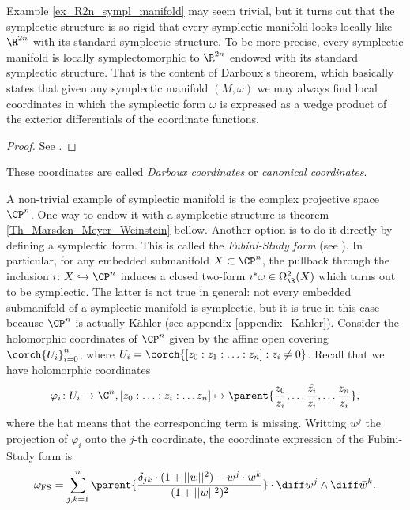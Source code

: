 Example \ref{ex_R2n_sympl_manifold} may seem trivial, but it turns out that the symplectic structure is so rigid that every symplectic manifold looks locally like \(\R^{2n}\) with its standard symplectic structure. To be more precise, every symplectic manifold is locally symplectomorphic to \(\R^{2n}\) endowed with its standard symplectic structure. That is the content of Darboux's theorem, which basically states that given any symplectic manifold \((M, \omega)\) we may always find local coordinates in which the symplectic form \(\omega\) is expressed as a wedge product of the exterior differentials of the coordinate functions.

\begin{proof}
    See \parencite[Prop. 22.13]{lee_introSM}.
\end{proof}
These coordinates are called \textit{Darboux coordinates} or \textit{canonical coordinates}. 

\begin{example} \label{ex_Fubini_Study}
    A non-trivial example of symplectic manifold is the complex projective space \(\CP^n\). One way to endow it with a symplectic structure is theorem \ref{Th_Marsden_Meyer_Weinstein} bellow. Another option is to do it directly by defining a symplectic form. This is called the \textit{Fubini-Study form} (see \parencite[Ex. 8.14]{lee_introCM}). In particular, for any embedded submanifold \(X \subset \CP^n\), the pullback through the inclusion \(\imath \colon X \hookrightarrow \CP^n\) induces a closed two-form \(\imath^*\omega\in \Omega_\R^2(X)\) which turns out to be symplectic. The latter is not true in general: not every embedded submanifold of a symplectic manifold is symplectic, but it is true in this case because \(\CP^n\) is actually Kähler (see appendix \ref{appendix_Kahler}). Consider the holomorphic coordinates of \(\CP^n \) given by the affine open covering \(\corch{U_i}_{i=0}^n\), where \(U_i=\corch{[z_0:z_1:\ldots :z_n]: z_i \neq 0}\). Recall that we have holomorphic coordinates 
    \[
    \varphi_i\colon U_i \to \C^n, [z_0:\ldots :z_i: \ldots z_n] \mapsto \parent{\frac{z_0}{z_i}, \ldots \frac{\hat{z_i}}{z_i}, \ldots \frac{z_n}{z_i}},
    \]
    where the hat means that the corresponding term is missing. Writting \(w^j\) the projection of \(\varphi_i\) onto the \(j\)-th coordinate, the coordinate expression of the Fubini-Study form is
    \begin{equation} \label{def_Fubini_Study}
    \omega_{\mathrm{FS}}=\sum_{j,k=1}^n \parent{\frac{\delta_{jk} \cdot (1+||w||^2)-\bar{w}^j \cdot w^k}{(1+||w||^2)^2}} \cdot \diff w^j \wedge \diff \bar{w}^k .
    \end{equation}
\end{example}

